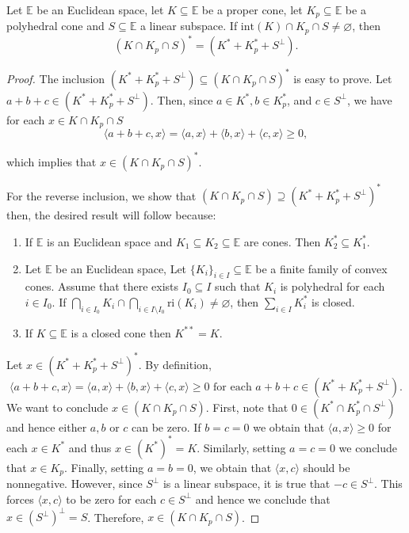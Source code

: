 \documentclass[a4paper]{article}
\begin{document}
      
\begin{lemma}\label{lema1}
Let $\mathbb{E}$ be an Euclidean space, let \mbox{$K\subseteq\mathbb{E}$} be a proper
cone, let \mbox{$K_p\subseteq\mathbb{E}$} be a polyhedral cone and
$S\subseteq\mathbb{E}$ a linear subspace. If  $\mbox{int}(K)\cap K_p\cap
S\neq\varnothing$, then $$(K\cap K_p\cap S)^\ast=(K^\ast+K^\ast_p+S^\bot).$$
\end{lemma}
\begin{proof}
The inclusion $(K^\ast+ K^\ast_p+S^\bot)\subseteq(K\cap K_p\cap S)^\ast$ is easy
to prove. Let \mbox{$a+b+c\in(K^\ast+K^\ast_p+S^\bot)$}. Then, since $a\in
K^\ast, b\in K^\ast_p$, and $c\in S^\bot$, we have for each
\mbox{\(x\in K\cap K_p\cap S\)}
$$\langle a+b+c,x\rangle=\langle a,x\rangle+\langle b,x\rangle+\langle
c,x\rangle\geq 0,$$

which implies that \(x\in (K\cap K_p\cap S)^\ast\).


For the reverse inclusion, we show that $(K\cap K_p\cap S)\supseteq(K^\ast+K^\ast_p+
S^\bot)^\ast$ then, the desired result will follow because:
\begin{enumerate}[label=(\roman*)]
\item If \(\mathbb{E}\) is an Euclidean space and \(K_1\subseteq
  K_2\subseteq\mathbb{E}\) are cones. Then \(K_2^\ast\subseteq K_1^\ast\).
\item Let $\mathbb{E}$ be an Euclidean space, Let \(\{K_i\}_{i\in
    I}\subseteq\mathbb{E}\) be a finite family of convex cones. Assume that there exists
  \(I_0\subseteq I\) such that \(K_i\) is polyhedral for each \(i\in I_0\). If
  $\bigcap_{i\in I_0}K_i\cap\bigcap_{i\in I\setminus
    I_0}\text{ri}(K_i)\not=\varnothing $, then $\sum_{i\in I}K_i^\ast$ is  closed.
\item If \(K\subseteq\mathbb{E}\) is a closed cone then \(K^{\ast\ast}=K\).

\end{enumerate} Let \mbox{$x\in(K^\ast+K^\ast_p+S^\bot)^\ast$.} By definition,
$$\langle a+b+c,x\rangle=\langle a,x\rangle+\langle b,x\rangle+\langle c,x\rangle\geq 0 \text{ for each } a+b+c\in(K^\ast+K^\ast_p+S^\bot).$$
We want to conclude $x\in (K\cap K_p\cap S)$. First, note that \(0\in
(K^\ast\cap K_p^\ast\cap S^\bot)\) and hence either \(a,b\) or \(c\) can be
zero.
If $b=c=0$ we obtain that
$\langle a,x\rangle\geq 0$ for each \(x \in K^\ast\) and thus \(x\in
(K^\ast)^\ast=K\). Similarly, setting  $a=c=0$ we conclude that \(x\in K_p\).
Finally, setting \(a=b=0\), we obtain that \(\langle x,c\rangle\) should be
nonnegative. However, since $S^\bot$ is a linear subspace, it is true that $-c\in
S^\bot$. This forces $\langle x,c\rangle$ to be zero for each 
$c\in S^\bot$ and hence we conclude that \(x\in(S^\bot)^\bot=S\). Therefore, $x\in (K\cap K_p\cap S)$.
\end{proof}
\end{document}
